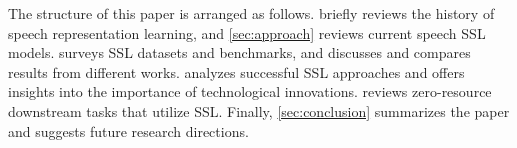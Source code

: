 
The structure of this paper is arranged as follows. 
briefly reviews the history of speech representation learning, and
\cref{sec:approach} reviews current speech SSL models.
 surveys SSL datasets and benchmarks, 
and discusses and compares results from different works. 
analyzes successful SSL approaches and offers insights into the
importance of technological innovations.  reviews 
zero-resource downstream tasks that utilize SSL. 
Finally, \cref{sec:conclusion} summarizes the paper and suggests 
future research directions.


